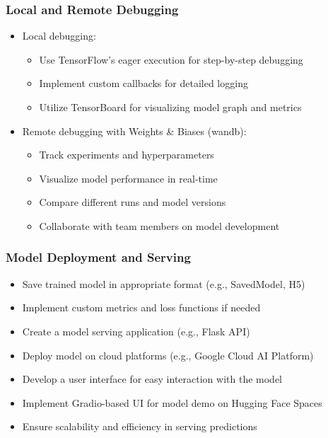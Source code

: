 \begin{frame}[fragile]\frametitle{Local and Remote Debugging}
\begin{itemize}
\item Local debugging:
  \begin{itemize}
  \item Use TensorFlow's eager execution for step-by-step debugging
  \item Implement custom callbacks for detailed logging
  \item Utilize TensorBoard for visualizing model graph and metrics
  \end{itemize}
\item Remote debugging with Weights \& Biases (wandb):
  \begin{itemize}
  \item Track experiments and hyperparameters
  \item Visualize model performance in real-time
  \item Compare different runs and model versions
  \item Collaborate with team members on model development
  \end{itemize}
\end{itemize}
\end{frame}

\begin{frame}[fragile]\frametitle{Model Deployment and Serving}
\begin{itemize}
\item Save trained model in appropriate format (e.g., SavedModel, H5)
\item Implement custom metrics and loss functions if needed
\item Create a model serving application (e.g., Flask API)
\item Deploy model on cloud platforms (e.g., Google Cloud AI Platform)
\item Develop a user interface for easy interaction with the model
\item Implement Gradio-based UI for model demo on Hugging Face Spaces
\item Ensure scalability and efficiency in serving predictions
\end{itemize}
\end{frame}


